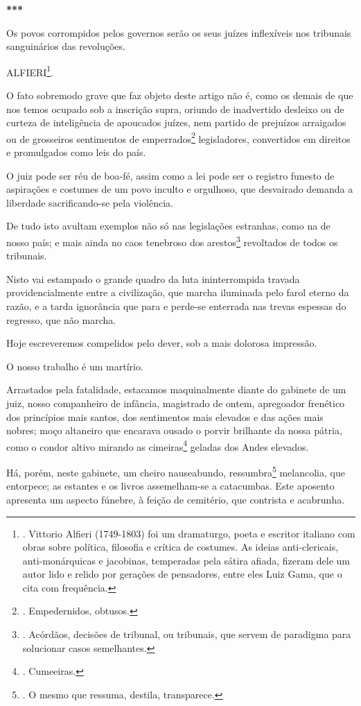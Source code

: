 \textbf{***}

Os povos corrompidos pelos governos serão os seus juízes inflexíveis nos
tribunais sanguinários das revoluções.

ALFIERI\footnote{. Vittorio Alfieri (1749-1803) foi um dramaturgo, poeta
  e escritor italiano com obras sobre política, filosofia e crítica de
  costumes. As ideias anti-clericais, anti-monárquicas e jacobinas,
  temperadas pela sátira afiada, fizeram dele um autor lido e relido por
  gerações de pensadores, entre eles Luiz Gama, que o cita com
  frequência.}.

O fato sobremodo grave que faz objeto deste artigo não é, como os demais
de que nos temos ocupado sob a inscrição supra, oriundo de inadvertido
desleixo ou de curteza de inteligência de apoucados juízes, nem partido
de prejuízos arraigados ou de grosseiros sentimentos de
emperrados\footnote{. Empedernidos, obtusos.} legisladores, convertidos
em direitos e promulgados como leis do país.

O juiz pode ser réu de boa-fé, assim como a lei pode ser o registro
funesto de aspirações e costumes de um povo inculto e orgulhoso, que
desvairado demanda a liberdade sacrificando-se pela violência.

De tudo isto avultam exemplos não só nas legislações estranhas, como na
de nosso país; e mais ainda no caos tenebroso dos arestos\footnote{.
  Acórdãos, decisões de tribunal, ou tribunais, que servem de paradigma
  para solucionar casos semelhantes.} revoltados de todos os tribunais.

Nisto vai estampado o grande quadro da luta ininterrompida travada
providencialmente entre a civilização, que marcha iluminada pelo farol
eterno da razão, e a tarda ignorância que para e perde-se enterrada nas
trevas espessas do regresso, que não marcha.

Hoje escreveremos compelidos pelo dever, sob a mais dolorosa impressão.

O nosso trabalho é um martírio.

Arrastados pela fatalidade, estacamos maquinalmente diante do gabinete
de um juiz, nosso companheiro de infância, magistrado de ontem,
apregoador frenético dos princípios mais santos, dos sentimentos mais
elevados e das ações mais nobres; moço altaneiro que encarava ousado o
porvir brilhante da nossa pátria, como o condor altivo mirando as
cimeiras\footnote{. Cumeeiras.} geladas dos Andes elevados.

Há, porém, neste gabinete, um cheiro nauseabundo, ressumbra\footnote{. O
  mesmo que ressuma, destila, transparece.} melancolia, que entorpece;
as estantes e os livros assemelham-se a catacumbas. Este aposento
apresenta um aspecto fúnebre, à feição de cemitério, que contrista e
acabrunha.

